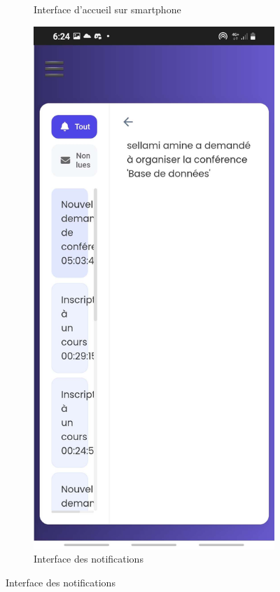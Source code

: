 \documentclass{article}
\begin{document}
\begin{figure}[H]
\begin{subfigure}[t]{0.4\textwidth}
    \caption{Interface d’accueil sur smartphone }
    \label{fig:courtlphn}
  \end{subfigure}
    \hspace{1cm}
    \begin{subfigure}[t]{0.4\textwidth}
      \centering
      \includegraphics[width=\textwidth]{notif.jpg}
      \caption{Interface des notifications}
      \label{fig:notif}
  \end{subfigure}
  \label{fig:login}
\end{figure}
\end{document}
